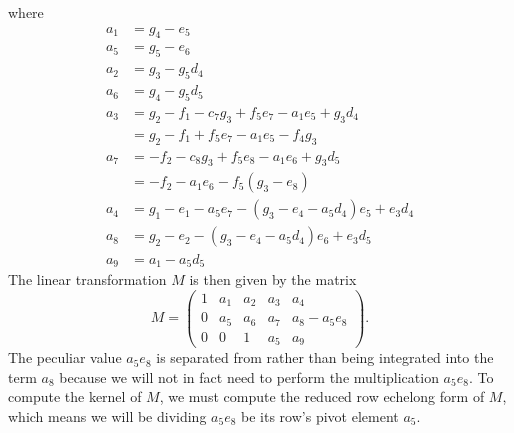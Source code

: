 where
\begin{align*}
  a_1 &= g_4 - e_5 \\
  a_5 &= g_5 - e_6 \\
  a_2 &= g_3 - g_5d_4 \\
  a_6 &= g_4 - g_5d_5 \\
  a_3 &= g_2 - f_1 - c_7g_3 + f_5e_7 - a_1e_5 + g_3d_4 \\
      &= g_2 - f_1 + f_5e_7 - a_1e_5 - f_4g_3 \\
  a_7 &=     - f_2 - c_8g_3 + f_5e_8 - a_1e_6 + g_3d_5 \\
      &=     - f_2 - a_1e_6 - f_5(g_3 - e_8) \\
  a_4 &= g_1 - e_1 - a_5e_7 - (g_3 - e_4 - a_5d_4)e_5 + e_3d_4 \\
  a_8 &= g_2 - e_2 - (g_3 - e_4 - a_5d_4)e_6 + e_3d_5 \\
  a_9 &= a_1 - a_5d_5
\end{align*}
The linear transformation $M$ is then given by the matrix
\[ M = \begin{pmatrix}
  1 & a_1 & a_2 & a_3 & a_4 \\
  0 & a_5 & a_6 & a_7 & a_8 - a_5e_8 \\
  0 &   0 &   1 & a_5 & a_9
\end{pmatrix}. \]
The peculiar value $a_5e_8$ is separated from rather than being integrated into the term $a_8$
because we will not in fact need to perform the multiplication $a_5e_8$.
To compute the kernel of $M$, we must compute the reduced row echelong form of $M$,
which means we will be dividing $a_5e_8$ be its row's pivot element $a_5$.

